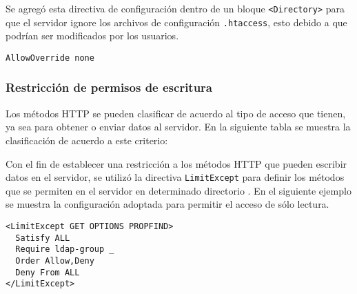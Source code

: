 Se agreg\'{o} esta directiva de configuraci\'{o}n dentro de un bloque \texttt{<Directory>} para que el servidor ignore los archivos de configuraci\'{o}n \texttt{.htaccess}, esto debido a que podr\'{i}an ser modificados por los usuarios.

{
\scriptsize
\linespread{1}
\begin{verbatim}
AllowOverride none
\end{verbatim}
}

        \subsubsection{Restricci\'{o}n de permisos de escritura}

Los m\'{e}todos \textsc{HTTP} se pueden clasificar de acuerdo al tipo de acceso que tienen, ya sea para obtener o enviar datos al servidor. En la siguiente tabla se muestra la clasificaci\'{o}n de acuerdo a este criterio:

{
 \linespread{1}
 \begin{table}[H]
 \caption{Clasificaci\'{o}n de m\'{e}todos \textsc{HTTP}}{}
 \label{tab:http-methods}
 \noindent{} %
 \end{table}
}

Con el fin de establecer una restricci\'{o}n a los m\'{e}todos \textsc{HTTP} que pueden escribir datos en el servidor, se utiliz\'{o} la directiva \texttt{LimitExcept} para definir los m\'{e}todos que se permiten en el servidor en determinado directorio \cite{_core_????}. En el siguiente ejemplo se muestra la configuraci\'{o}n adoptada para permitir el acceso de s\'{o}lo lectura.


{
\scriptsize
\linespread{1}
\begin{verbatim}
<LimitExcept GET OPTIONS PROPFIND>
  Satisfy ALL
  Require ldap-group _
  Order Allow,Deny
  Deny From ALL
</LimitExcept>
\end{verbatim}
}

